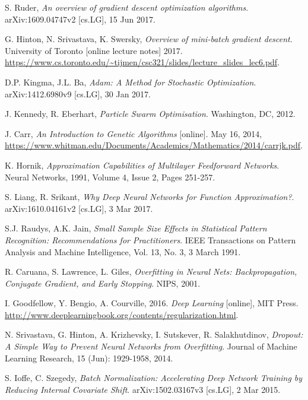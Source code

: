 \documentclass[../main.tex]{subfiles}
\begin{document}
\begin{thebibliography}{999}

  S. Ruder,
  \emph{An overview of gradient descent optimization algorithms}.
  arXiv:1609.04747v2 [cs.LG],
  15 Jun 2017.

  G. Hinton, N. Srivastava, K. Swersky,
  \emph{Overview of mini-batch gradient descent}.
  University of Toronto
  [online lecture notes]
  2017.
  \url{https://www.cs.toronto.edu/~tijmen/csc321/slides/lecture_slides_lec6.pdf}.

  D.P. Kingma, J.L. Ba,
  \emph{Adam: A Method for Stochastic Optimization}.
  arXiv:1412.6980v9 [cs.LG],
  30 Jan 2017.

  J. Kennedy, R. Eberhart,
  \emph{Particle Swarm Optimisation}.
  Washington, DC,
  2012.

  J. Carr,
  \emph{An Introduction to Genetic Algorithms}
  [online].
  May 16, 2014,
  \url{https://www.whitman.edu/Documents/Academics/Mathematics/2014/carrjk.pdf}.

  K. Hornik,
  \emph{Approximation Capabilities of Multilayer Feedforward Networks}.
  Neural Networks,
  1991,
  Volume 4,
  Issue 2,
  Pages 251-257.

  S. Liang, R. Srikant,
  \emph{Why Deep Neural Networks for Function Approximation?}.
  arXiv:1610.04161v2 [cs.LG],
  3 Mar 2017.

  S.J. Raudys, A.K. Jain,
  \emph{Small Sample Size Effects in Statistical Pattern Recognition: Recommendations for Practitioners}.
  IEEE Transactions on Pattern Analysis and Machine Intelligence,
  Vol. 13, No. 3,
  3 March 1991.

  R. Caruana, S. Lawrence, L. Giles,
  \emph{Overfitting in Neural Nets: Backpropagation, Conjugate Gradient, and Early Stopping}.
  NIPS,
  2001.

  I. Goodfellow, Y. Bengio, A. Courville,
  2016.
  \emph{Deep Learning}
  [online],
  MIT Press.
  \url{http://www.deeplearningbook.org/contents/regularization.html}.

  N. Srivastava, G. Hinton, A. Krizhevsky, I. Sutskever, R. Salakhutdinov,
  \emph{Dropout: A Simple Way to Prevent Neural Networks from Overfitting}.
  Journal of Machine Learning Research, 
  15 (Jun): 1929-1958, 2014.

  S. Ioffe, C. Szegedy,
  \emph{Batch Normalization: Accelerating Deep Network Training by Reducing Internal Covariate Shift}.
  arXiv:1502.03167v3 [cs.LG],
  2 Mar 2015.


\end{thebibliography}
\end{document}
